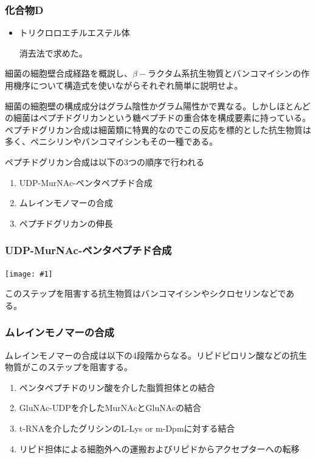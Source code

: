 \documentclass[a4paper,papersize,dvipdfmx]{jsarticle}
\newcommand{\pict}[2]{\begin{center} \texttt{[image: \#1]} \end{center}}   %
\begin{document}
\subsubsection*{化合物D}
\begin{itemize}
\item トリクロロエチルエステル体

消去法で求めた。
\end{itemize}












\begin{tcolorbox}[colback=white,colbacktitle=black,coltitle=white,title={3.}]
細菌の細胞壁合成経路を概説し、$\beta -$ラクタム系抗生物質とバンコマイシンの作用機序について構造式を使いながらそれぞれ簡単に説明せよ。
\end{tcolorbox}

細菌の細胞壁の構成成分はグラム陰性かグラム陽性かで異なる。しかしほとんどの細菌はペプチドグリカンという糖ペプチドの重合体を構成要素に持っている。ペプチドグリカン合成は細菌類に特異的なのでこの反応を標的とした抗生物質は多く、ペニシリンやバンコマイシンもその一種である。

ペプチドグリカン合成は以下の3つの順序で行われる
\begin{enumerate}
\item UDP-MurNAc-ペンタペプチド合成
\item ムレインモノマーの合成
\item ペプチドグリカンの伸長

\end{enumerate}
\subsubsection*{UDP-MurNAc-ペンタペプチド合成}
\pict{imgs-k/k3-1.jpg}{14}

このステップを阻害する抗生物質はバンコマイシンやシクロセリンなどである。

\subsubsection*{ムレインモノマーの合成}
ムレインモノマーの合成は以下の4段階からなる。リピドピロリン酸などの抗生物質がこのステップを阻害する。
\begin{enumerate}
\item ペンタペプチドのリン酸を介した脂質担体との結合
\item GluNAc-UDPを介したMurNAcとGluNAcの結合
\item t-RNAを介したグリシンのL-Lys or m-Dpmに対する結合
\item リピド担体による細胞外への運搬およびリピドからアクセプターへの転移
\end{enumerate}
\end{document}
